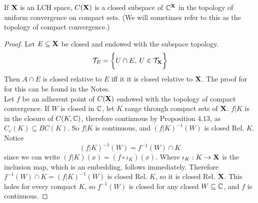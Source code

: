 \documentclass[../../main.tex]{subfiles}
\begin{document}
\begin{wts}
    If ${\mathbf{X}}$ is an LCH space, $C({\mathbf{X}})$ is a closed subspace of $\mathbb{C}^{\mathbf{X}}$ in the topology of uniform convergence on compact sets. (We will sometimes refer to this as the topology of compact convergence.)
\end{wts}
\begin{proof}
    Let $E\subseteq {\mathbf{X}}$ be closed and endowed with the subspace topology.
    \[
        \mathcal{T}_E = \biggl\{{U\cap E,\: U\in\mathcal{T}_{\mathbf{X}}}\biggr\}
    \]
    Then $A\cap E$ is closed relative to $E$ iff it it is closed relative to ${\mathbf{X}}$. The proof for for this can be found in the Notes.\\

    Let $f$ be an adherent point of $C({\mathbf{X}})$ endowed with the topology of compact convergence. If $W$ is closed in ${\mathbb{C}}$, let $K$ range through compact sets of ${\mathbf{X}}$. $f|K$ is in the closure of $C(K,{\mathbb{C}})$, therefore continuous by Proposition 4.13, as $C_c(K)\subseteq BC(K)$. So $f|K$ is continuous, and $(f|K)^{-1}(W)$ is closed Rel. $K$. Notice
    \begin{equation}\label{chp4:4.38-restriction-intersection}
            (f|K)^{-1}(W) = f^{-1}(W)\cap K    
    \end{equation}
    since we can write $(f|K)(x) = (f\circ \iota_K)(x)$. Where $\iota_K: K\to {\mathbf{X}}$ is the inclusion map, which is an embedding.  follows immediately. Therefore $f^{-1}(W)\cap K = (f|K)^{-1}(W)$ is closed Rel. $K$, so it is closed Rel. ${\mathbf{X}}$. This holes for every compact $K$, so $f^{-1}(W)$ is closed for any closed $W\subseteq{\mathbb{C}}$, and $f$ is continuous.
\end{proof}
\end{document}
